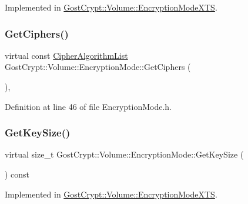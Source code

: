 Implemented in \hyperlink{class_gost_crypt_1_1_volume_1_1_encryption_mode_x_t_s_ad51337408f2e52afdd18491429fb6ea6}{Gost\+Crypt\+::\+Volume\+::\+Encryption\+Mode\+X\+TS}.

\mbox{\label{class_gost_crypt_1_1_volume_1_1_encryption_mode_a9d2af2998bfe7ebd40a369b5452e55c3}} 
\subsubsection{\texorpdfstring{Get\+Ciphers()}{GetCiphers()}}
{\footnotesize\ttfamily virtual const \hyperlink{namespace_gost_crypt_1_1_volume_ad32c730cdf3a63d2bafbac0f63f0740f}{Cipher\+Algorithm\+List} Gost\+Crypt\+::\+Volume\+::\+Encryption\+Mode\+::\+Get\+Ciphers (\begin{DoxyParamCaption}{ }\end{DoxyParamCaption})\hspace{0.3cm}{\ttfamily [inline]}, {\ttfamily [virtual]}}



Definition at line 46 of file Encryption\+Mode.\+h.

\mbox{\label{class_gost_crypt_1_1_volume_1_1_encryption_mode_a2879197c50f2e834f22d87def6c3ec0f}} 
\subsubsection{\texorpdfstring{Get\+Key\+Size()}{GetKeySize()}}
{\footnotesize\ttfamily virtual size\+\_\+t Gost\+Crypt\+::\+Volume\+::\+Encryption\+Mode\+::\+Get\+Key\+Size (\begin{DoxyParamCaption}{ }\end{DoxyParamCaption}) const\hspace{0.3cm}{\ttfamily [pure virtual]}}



Implemented in \hyperlink{class_gost_crypt_1_1_volume_1_1_encryption_mode_x_t_s_a01604711469ba3dc601b0589a4fdee3e}{Gost\+Crypt\+::\+Volume\+::\+Encryption\+Mode\+X\+TS}.

